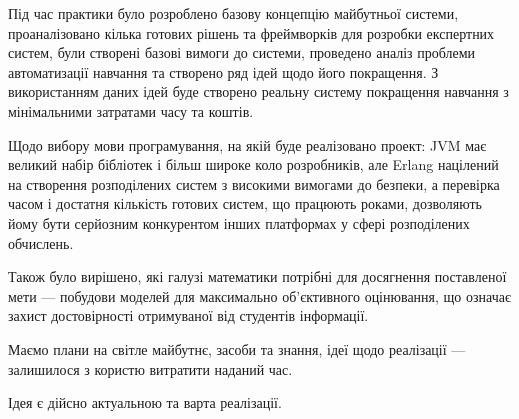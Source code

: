 
Під час практики було розроблено базову концепцію майбутньої системи,
проаналізовано кілька готових рішень та фреймворків для розробки експертних
систем, були створені базові вимоги до системи,
проведено аналіз проблеми автоматизації навчання та створено ряд ідей щодо
його покращення.
З використанням даних ідей буде створено реальну систему покращення навчання з
мінімальними затратами часу та коштів.

Щодо вибору мови програмування, на якій буде реалізовано проект: JVM має
великий набір бібліотек і більш широке коло розробників, але Erlang націлений
на створення розподілених систем з високими вимогами до безпеки, а перевірка
часом і достатня кількість готових систем, що працюють роками, дозволяють
йому бути серйозним конкурентом інших платформах у сфері розподілених
обчислень.

Також було вирішено, які галузі математики потрібні для досягнення поставленої
мети --- побудови моделей для максимально об’єктивного оцінювання, що означає
захист достовірності отримуваної від студентів інформації.

Маємо плани на світле майбутнє, засоби та знання, ідеї щодо реалізації ---
залишилося з користю витратити наданий час.

Ідея є дійсно актуальною та варта реалізації.
